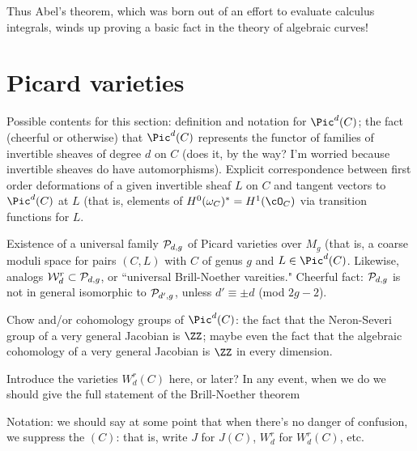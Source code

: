 Thus Abel's theorem, which was born out of an effort to evaluate calculus integrals, winds up proving a basic fact in the theory of algebraic curves!



\section{Picard varieties}\label{picard section}

Possible contents for this section: definition and notation for $\Pic^d(C)$; the fact (cheerful or otherwise) that $\Pic^d(C)$ represents the functor of families of invertible sheaves of degree $d$ on $C$ (does it, by the way? I'm worried because invertible sheaves do have automorphisms). Explicit correspondence between first order deformations of a given invertible sheaf $L$ on $C$ and tangent vectors to $\Pic^d(C)$ at $L$ (that is, elements of $H^0(\omega_C)^* = H^1(\cO_C)$ via transition functions for $L$.

\def\cW{{\mathcal W}}

Existence of a universal family $\cP_{d,g}$ of Picard varieties over $M_g$ (that is, a coarse moduli space for pairs $(C,L)$ with $C$ of genus $g$ and $L \in \Pic^d(C)$. Likewise, analogs $\cW^r_d \subset \cP_{d,g}$, or ``universal Brill-Noether vareities."
Cheerful fact: $\cP_{d,g}$ is not in general isomorphic to $\cP_{d',g}$, unless $d' \equiv
 \pm d$ (mod $2g-2$). 
 
 Chow and/or cohomology groups of $\Pic^d(C)$: the fact that the Neron-Severi group of a very general Jacobian is $\ZZ$; maybe even the fact that the algebraic cohomology of a very general Jacobian is $\ZZ$ in every dimension.
 
 Introduce the varieties $W^r_d(C)$ here, or later? In any event, when we do we should give the full statement of the Brill-Noether theorem
 
 Notation: we should say at some point that when there's no danger of confusion, we suppress the $(C)$: that is, write $J$ for $J(C)$, $W^r_d$ for $W^r_d(C)$, etc.

